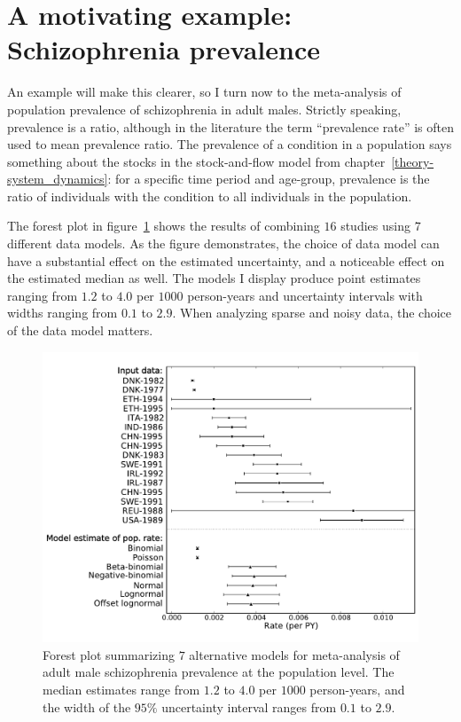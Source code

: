 \section{A motivating example: Schizophrenia prevalence}
An example will make this clearer, so I turn now to the meta-analysis
of population prevalence of schizophrenia in adult males.  Strictly
speaking, prevalence is a ratio, although in the
literature the term ``prevalence rate'' is often used to mean
prevalence ratio.  The prevalence of a condition in a population says
something about the stocks in the stock-and-flow model from
chapter~\ref{theory-system_dynamics}: for a specific time period and
age-group, prevalence is the ratio of individuals with the condition
to all individuals in the population.

The forest plot in figure~\ref{rate-model-schiz-forest} shows the
results of combining $16$ studies using $7$ different data models.  As
the figure demonstrates, the choice of data model can have a
substantial effect on the estimated uncertainty, and a
noticeable effect on the estimated median as well. The models I
display produce point estimates ranging from $1.2$ to $4.0$ per
$1000$ person-years and uncertainty intervals with widths ranging from $0.1$ to
$2.9$.  When analyzing sparse and noisy data, the choice of the data model
matters.

\begin{figure}[h]
\begin{center}
\includegraphics[width=\textwidth]{schiz_forest.pdf}
\caption{Forest plot summarizing $7$ alternative models for
  meta-analysis of adult male schizophrenia prevalence at the
  population level.  The median estimates range from
  $1.2$ to
  $4.0$ per $1000$ person-years, and the width of the
  $95\%$ uncertainty interval ranges from
  $0.1$ to
  $2.9$.}
\label{rate-model-schiz-forest}
\end{center}
\end{figure}

